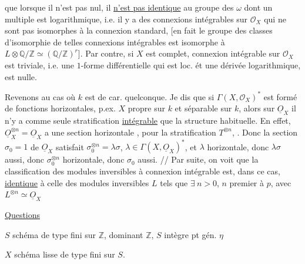 

que lorsque il n'est pas nul, il \uline{n'est pas identique} au groupe des $\omega$ dont un multiple est logarithmique, i.e. il y a des  connexions intégrables sur $\mathcal O_X$ qui ne sont pas isomorphes à la connexion standard, [en fait le groupe des classes d'isomorphie de telles connexions intégrables est isomorphe à  $L\otimes\mathbb Q/\mathbb Z\simeq(\mathbb Q/\mathbb Z)^{r}$]. Par contre, si $X$ est complet,   connexion intégrable sur $\mathcal O_X$ est triviale, i.e. une $1$-forme différentielle qui est loc. ét une dérivée logarithmique, est nulle. 

Revenons au cas où $k$ est de car. quelconque. Je dis que si $\Gamma(X,\mathcal O_X)^{*}$ est formé de fonctions horizontales,  p.ex. $X$ propre sur $k$ et séparable sur $k$, alors sur $\underline O_X$ il n'y a comme seule  stratification \uline{intégrable} que la structure habituelle. En effet, $\underline O_X^{\otimes n}=\underline O_X$  a une section horizontale ,  pour la stratification $T^{\otimes n}$, . Donc la section $\sigma_0=1$ de $\underline O_X$ satisfait $\sigma_0^{\otimes n}=\lambda\sigma$, $\lambda\in\Gamma(X,\underline O_X)^{*}$,  et $\lambda$ horizontale,  donc $\lambda\sigma$ aussi, donc $\sigma_0^{\otimes n}$ horizontale, donc $\sigma_0$ aussi. // Par suite, on voit que la classification des  modules inversibles à connexion intégrable est, dans ce cas, \uline{identique} à celle des modules inversibles  $L$ tels que $\exists\ n>0$, $n$ premier à $p$, avec $L^{\otimes n}\simeq\underline O_X$


\uline{Questions}

$S$ schéma de type fini sur $\mathbb Z$, dominant $\mathbb Z$, $S$ intègre pt gén. $\eta$

$X$ schéma lisse de type fini sur $S$.

